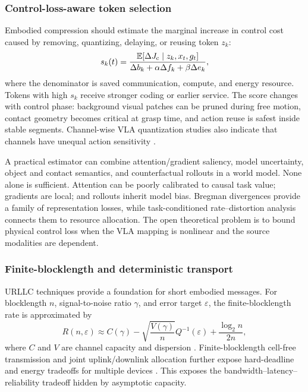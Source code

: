 \documentclass[letterpaper,journal]{IEEEtran}
\begin{document}
\subsubsection{Control-loss-aware token selection}
Embodied compression should estimate the marginal increase in control cost
caused by removing, quantizing, delaying, or reusing token $z_k$:
\begin{equation}
s_k(t)=
\frac{\mathbb{E}[\Delta J_{\rm c}\mid z_k,x_t,g_t]}
{\Delta b_k+\alpha\Delta f_k+\beta\Delta e_k},
\label{eq:token_value}
\end{equation}
where the denominator is saved communication, compute, and energy resource.
Tokens with high $s_k$ receive stronger coding or earlier service. The score
changes with control phase: background visual patches can be pruned during
free motion, contact geometry becomes critical at grasp time, and action
reuse is safest inside stable segments. Channel-wise VLA quantization studies
also indicate that channels have unequal action sensitivity \cite{qvla}.

A practical estimator can combine attention/gradient saliency, model
uncertainty, object and contact semantics, and counterfactual rollouts in a
world model. None alone is sufficient. Attention can be poorly calibrated to
causal task value; gradients are local; and rollouts inherit model bias.
Bregman divergences provide a family of representation losses, while
task-conditioned rate--distortion analysis connects them to resource
allocation. The open theoretical problem is to bound physical control loss
when the VLA mapping is nonlinear and the source modalities are dependent.

\subsubsection{Finite-blocklength and deterministic transport}
URLLC techniques provide a foundation for short embodied messages.
For blocklength $n$, signal-to-noise ratio $\gamma$, and error target
$\varepsilon$, the finite-blocklength rate is approximated by
\begin{equation}
R(n,\varepsilon)\approx C(\gamma)
-\sqrt{\frac{V(\gamma)}{n}}Q^{-1}(\varepsilon)
+\frac{\log_2 n}{2n},
\label{eq:fbl}
\end{equation}
where $C$ and $V$ are channel capacity and dispersion
\cite{polyanskiy}. Finite-blocklength cell-free transmission and joint
uplink/downlink allocation further expose hard-deadline and energy tradeoffs
for multiple devices \cite{cellfree,resourceurlcc}. This exposes the
bandwidth--latency--reliability tradeoff hidden by asymptotic capacity.
\end{document}

